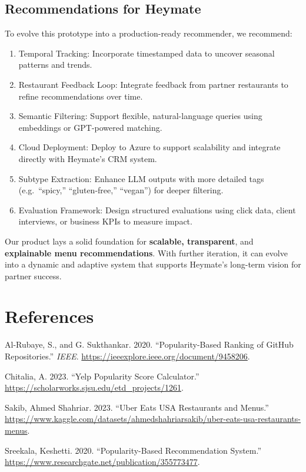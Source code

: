 \documentclass[
  11pt,
  a4paper,
  DIV=11,
  numbers=noendperiod]{scrartcl}
\providecommand{\tightlist}{%
  \setlength{\itemsep}{0pt}\setlength{\parskip}{0pt}}\usepackage{longtable,booktabs,array}
\newlength{\cslhangindent}
\newenvironment{CSLReferences}[2] %
 {\begin{list}{}{%
  \setlength{\itemindent}{0pt}
  \setlength{\leftmargin}{0pt}
  \setlength{\parsep}{0pt}
  \ifodd #1
   \setlength{\leftmargin}{\cslhangindent}
   \setlength{\itemindent}{-1\cslhangindent}
  \fi
  \setlength{\itemsep}{#2\baselineskip}}}
 {\end{list}}
\begin{document}
\subsection{Recommendations for
Heymate}\label{recommendations-for-heymate}

To evolve this prototype into a production-ready recommender, we
recommend:

\begin{enumerate}
\def\labelenumi{\arabic{enumi}.}
\tightlist
\item
  Temporal Tracking: Incorporate timestamped data to uncover seasonal
  patterns and trends.
\item
  Restaurant Feedback Loop: Integrate feedback from partner restaurants
  to refine recommendations over time.
\item
  Semantic Filtering: Support flexible, natural-language queries using
  embeddings or GPT-powered matching.
\item
  Cloud Deployment: Deploy to Azure to support scalability and integrate
  directly with Heymate's CRM system.
\item
  Subtype Extraction: Enhance LLM outputs with more detailed tags
  (e.g.~``spicy,'' ``gluten-free,'' ``vegan'') for deeper filtering.
\item
  Evaluation Framework: Design structured evaluations using click data,
  client interviews, or business KPIs to measure impact.
\end{enumerate}

Our product lays a solid foundation for \textbf{scalable, transparent},
and \textbf{explainable menu recommendations}. With further iteration,
it can evolve into a dynamic and adaptive system that supports Heymate's
long-term vision for partner success.

\newpage{}

\section*{References}\label{references}

\label{refs}
\begin{CSLReferences}{1}{0}
Al-Rubaye, S., and G. Sukthankar. 2020. {``Popularity-Based Ranking of
GitHub Repositories.''} \emph{IEEE}.
\url{https://ieeexplore.ieee.org/document/9458206}.

Chitalia, A. 2023. {``Yelp Popularity Score Calculator.''}
\url{https://scholarworks.sjsu.edu/etd_projects/1261}.

Sakib, Ahmed Shahriar. 2023. {``Uber Eats USA Restaurants and Menus.''}
\url{https://www.kaggle.com/datasets/ahmedshahriarsakib/uber-eats-usa-restaurants-menus}.

Sreekala, Keshetti. 2020. {``Popularity-Based Recommendation System.''}
\url{https://www.researchgate.net/publication/355773477}.

\end{CSLReferences}
\end{document}
